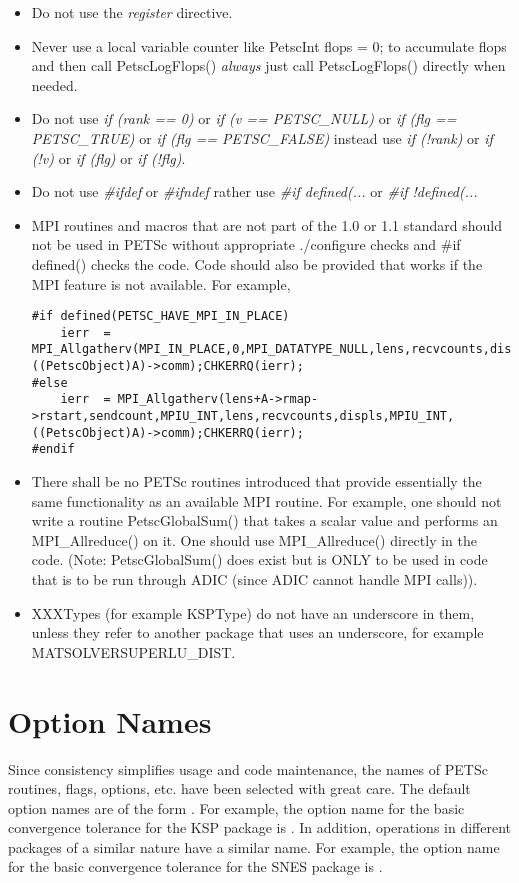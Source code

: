 \documentclass[twoside,12pt]{../sty/report_petsc}
\begin{document}
\begin{itemize}
\item Do not use the {\em register} directive.
\item Never use a local variable counter like PetscInt flops = 0; to accumulate flops and then call PetscLogFlops() {\em always} just
      call PetscLogFlops() directly when needed.
\item Do not use {\em if (rank == 0)} or {\em if (v == PETSC\_NULL)} or {\em if (flg == PETSC\_TRUE)} or {\em if (flg == PETSC\_FALSE)} 
instead use {\em if (!rank)} or {\em if (!v)} or {\em if (flg)} or {\em if (!flg)}.
\item Do not use {\em \#ifdef} or {\em \#ifndef} rather use {\em \#if defined(...} or {\em \#if !defined(...}
\item MPI routines and macros that are not part of the 1.0 or 1.1 standard should not be used in PETSc without appropriate ./configure checks and \#if defined() checks the code. Code should also be provided that works if the MPI feature is not available. For example, 
\begin{verbatim}
#if defined(PETSC_HAVE_MPI_IN_PLACE)
    ierr  = MPI_Allgatherv(MPI_IN_PLACE,0,MPI_DATATYPE_NULL,lens,recvcounts,displs,MPIU_INT,((PetscObject)A)->comm);CHKERRQ(ierr);
#else
    ierr  = MPI_Allgatherv(lens+A->rmap->rstart,sendcount,MPIU_INT,lens,recvcounts,displs,MPIU_INT,((PetscObject)A)->comm);CHKERRQ(ierr);
#endif
\end{verbatim}
\item There shall be no PETSc routines introduced that provide essentially the same functionality as an available MPI routine. For example, one should not write a routine PetscGlobalSum() that takes a scalar value and performs an MPI\_Allreduce() on it. One should use MPI\_Allreduce() directly in the code. (Note: PetscGlobalSum() does exist but is ONLY to be used in code that is to be run through ADIC (since ADIC cannot handle MPI calls)).
\item XXXTypes (for example KSPType) do not have an underscore in them, unless they refer to another package that uses an underscore, for example MATSOLVERSUPERLU\_DIST.
\end{itemize}

\section{Option Names}

Since consistency simplifies usage and code maintenance, the names of
PETSc routines, flags, options, etc. have been selected with great care.
The default option names are of the form .  
For example, the option name for the basic convergence tolerance for 
the KSP package is . In addition, operations in different 
packages of a similar nature have a similar name.  For example, the option
name for the basic convergence tolerance for the SNES package is 
. 
\end{document}
